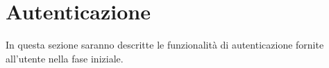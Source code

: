 %

\section{Autenticazione} %
\label{sec:autenticazione}
	In questa sezione saranno descritte le funzionalità di autenticazione\gloss{} fornite all'utente nella fase iniziale.



